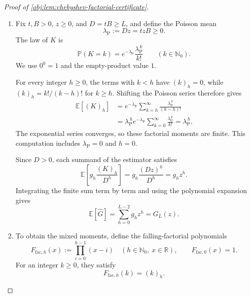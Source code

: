 \begin{proof}[Proof of \cref{obj:lem:chebyshev-factorial-certificate}]
\begin{enumerate}
\item Fix \(t,B>0\), \(z\ge0\), and \(D=tB\ge L\), and define the Poisson mean
\[
\lambda_{\mathrm P}:=Dz=tzB\ge0.
\]
The law of \(K\) is
\[
\mathbb P(K=k)=e^{-\lambda_{\mathrm P}}
              \frac{\lambda_{\mathrm P}^{\,k}}{k!}
\qquad(k\in\mathbb N_0).
\]
We use \(0^0=1\) and the empty-product value \(1\).

For every integer \(h\ge0\), the terms with \(k<h\) have \((k)_h=0\), while \((k)_h=k!/(k-h)!\) for \(k\ge h\). Shifting the Poisson series therefore gives
\[
\begin{aligned}
\mathbb E[(K)_h]
 &=e^{-\lambda_{\mathrm P}}
   \sum_{k=h}^{\infty}
   \frac{\lambda_{\mathrm P}^{\,k}}{(k-h)!}\\
 &=\lambda_{\mathrm P}^{\,h}e^{-\lambda_{\mathrm P}}
   \sum_{k=0}^{\infty}\frac{\lambda_{\mathrm P}^{\,k}}{k!}
 =\lambda_{\mathrm P}^{\,h}.
\end{aligned}
\]
The exponential series converges, so these factorial moments are finite. This computation includes \(\lambda_{\mathrm P}=0\) and \(h=0\).

Since \(D>0\), each summand of the estimator satisfies
\[
\mathbb E\!\left[g_h\frac{(K)_h}{D^h}\right]
 =g_h\frac{(Dz)^h}{D^h}
 =g_hz^h.
\]
Integrating the finite sum term by term and using the polynomial expansion gives
\[
\mathbb E[\widehat G]
 =\sum_{h=0}^{L-2}g_hz^h
 =G_L(z).
\]

\item To obtain the mixed moments, define the falling-factorial polynomials
\[
F_{\mathrm{fac},h}(x):=\prod_{i=0}^{h-1}(x-i)
\quad(h\in\mathbb N_0,\ x\in\mathbb R),
\qquad F_{\mathrm{fac},0}(x)=1.
\]
For an integer \(k\ge0\), they satisfy
\[
F_{\mathrm{fac},h}(k)=(k)_h.
\]


\end{enumerate}
\end{proof}
